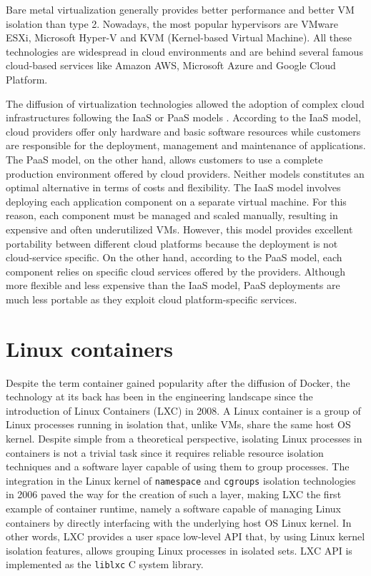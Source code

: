 Bare metal virtualization generally provides better performance and better VM isolation than type 2.
Nowadays, the most popular hypervisors are VMware ESXi, Microsoft Hyper-V and KVM (Kernel-based Virtual Machine).
All these technologies are widespread in cloud environments and are behind several famous cloud-based services like Amazon AWS, Microsoft Azure and Google Cloud Platform.

The diffusion of virtualization technologies allowed the adoption of complex cloud infrastructures following the IaaS or PaaS models \cite{stonemanLearnDockerMonth}.
According to the IaaS model, cloud providers offer only hardware and basic software resources while customers are responsible for the deployment, management and maintenance of applications.
The PaaS model, on the other hand, allows customers to use a complete production environment offered by cloud providers.
Neither models constitutes an optimal alternative in terms of costs and flexibility.
The IaaS model involves deploying each application component on a separate virtual machine. For this reason, each component must be managed and scaled manually, resulting in expensive and often underutilized VMs. However, this model provides excellent portability between different cloud platforms because the deployment is not cloud-service specific. On the other hand, according to the PaaS model, each component relies on specific cloud services offered by the providers. 
Although more flexible and less expensive than the IaaS model, PaaS deployments are much less portable as they exploit cloud platform-specific services.
 

\section{Linux containers}
Despite the term container gained popularity after the diffusion of Docker, the technology at its back has been in the engineering landscape since the introduction of Linux Containers (LXC) \cite{LinuxContainers} in 2008.
A Linux container is a group of Linux processes running in isolation that, unlike VMs, share the same host OS kernel. 
Despite simple from a theoretical perspective, isolating Linux processes in containers is not a trivial task since it requires reliable resource isolation techniques and a software layer capable of using them to group processes. 
The integration in the Linux kernel of \texttt{namespace} and \texttt{cgroups} isolation technologies in 2006 paved the way for the creation of such a layer, making LXC the first example of container runtime, namely a software capable of managing Linux containers by directly interfacing with the underlying host OS Linux kernel.
In other words, LXC provides a user space low-level API that, by using Linux kernel isolation features, allows grouping Linux processes in isolated sets.
LXC API is implemented as the \texttt{liblxc} C system library. 

